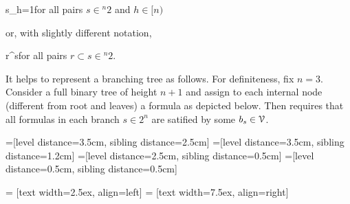 \documentclass[scombinatorics.tex]{subfiles}
\begin{document}
{\IFF}
{s_h=1}\hfill for all pairs $s\in {}^n2$ and $h\in[n)$

or, with slightly different notation,

{\IFF}
{r^\subseteq s}\hfill for all pairs $r\subset s\in {}^n2$.

It helps to represent a branching tree as follows.
For definiteness, fix $n=3$.
Consider a full binary tree of height $n+1$ and assign to each internal node (different from root and leaves) a formula as depicted below.
Then  requires that all formulas in each branch $s\in2^n$ are satified by some $b_s\in\EuScript V$.
\medskip

=[level distance=3.5cm, sibling distance=2.5cm]
=[level distance=3.5cm, sibling distance=1.2cm]
=[level distance=2.5cm, sibling distance=0.5cm]
=[level distance=0.5cm, sibling distance=0.5cm]

 = [text width=2.5ex, align=left]
 = [text width=7.5ex, align=right]
\end{document}
